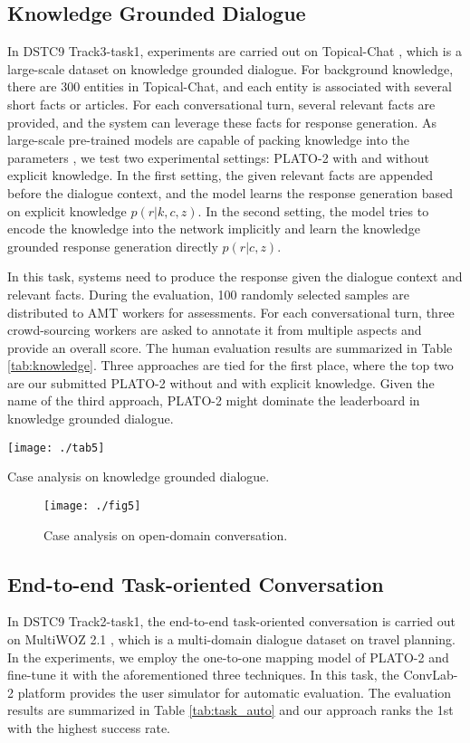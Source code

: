\documentclass[letterpaper]{article} \usepackage{aaai21}  \usepackage{times}  \usepackage{helvet} \usepackage{courier}  \usepackage[hyphens]{url}  \usepackage{graphicx} \urlstyle{rm} \def\UrlFont{\rm}  \usepackage{natbib}  \usepackage{caption} \frenchspacing  \setlength{\pdfpagewidth}{8.5in}  \setlength{\pdfpageheight}{11in}  \usepackage{amsmath}
\begin{document}
\subsection{Knowledge Grounded Dialogue}
In DSTC9 Track3-task1, experiments are carried out on Topical-Chat \cite{gopalakrishnan2019topical}, which is a large-scale dataset on knowledge grounded dialogue. For background knowledge, there are 300 entities in Topical-Chat, and each entity is associated with several short facts or articles. For each conversational turn, several relevant facts are provided, and the system can leverage these facts for response generation. As large-scale pre-trained models are capable of packing knowledge into the parameters \cite{roberts2020much}, we test two experimental settings: PLATO-2 with and without explicit knowledge. In the first setting, the given relevant facts are appended before the dialogue context, and the model learns the response generation based on explicit knowledge $p(r|k,c,z)$. In the second setting, the model tries to encode the knowledge into the network implicitly and learn the knowledge grounded response generation directly $p(r|c,z)$. 

In this task, systems need to produce the response given the dialogue context and relevant facts. During the evaluation, 100 randomly selected samples are distributed to AMT workers for assessments. For each conversational turn, three crowd-sourcing workers are asked to annotate it from multiple aspects and provide an overall score. The human evaluation results are summarized in Table \ref{tab:knowledge}. Three approaches are tied for the first place, where the top two are our submitted PLATO-2 without and with explicit knowledge. Given the name of the third approach, PLATO-2 might dominate the leaderboard in knowledge grounded dialogue.  
\begin{table*}
	\centering
	\texttt{[image: ./tab5]}
	\caption{Case analysis on knowledge grounded dialogue.}
	\label{tab:case_knowledge}
\end{table*} 
\begin{figure}
	\centering
	\texttt{[image: ./fig5]}
	\caption{Case analysis on open-domain conversation.}
	\label{fig:case_chat}
\end{figure} 

\subsection{End-to-end Task-oriented Conversation}
In DSTC9 Track2-task1, the end-to-end task-oriented conversation is carried out on MultiWOZ 2.1 \cite{eric2020multiwoz}, which is a multi-domain dialogue dataset on travel planning. In the experiments, we employ the one-to-one mapping model of PLATO-2 and fine-tune it with the aforementioned three techniques. In this task, the ConvLab-2 platform \cite{zhu2020convlab} provides the user simulator for automatic evaluation. The evaluation results are summarized in Table \ref{tab:task_auto} and our approach ranks the 1st with the highest success rate. 
\end{document}
